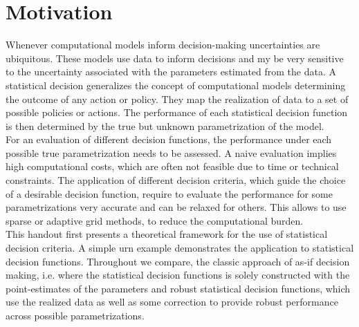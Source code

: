 \section*{Motivation}
Whenever computational models inform decision-making uncertainties are ubiquitous. These models use data to inform decisions and my be very sensitive to the uncertainty associated with the parameters estimated from the data. A statistical decision generalizes the concept of computational models determining the outcome of any action or policy. They map the realization of data to a set of possible policies or actions. The performance of each statistical decision function is then determined by the true but unknown parametrization of the model. \\

For an evaluation of different decision functions, the performance under each possible true parametrization needs to be assessed. A naive evaluation implies high computational costs, which are often not feasible due to time or technical constraints. The application of different decision criteria, which guide the choice of a desirable decision function, require to evaluate the performance for some parametrizations very accurate and can be relaxed for others. This allows to use sparse or adaptive grid methods, to reduce the computational burden. \\

This handout first presents a theoretical framework for the use of statistical decision criteria. A simple urn example demonstrates the application to statistical decision functions. Throughout we compare, the classic approach of as-if decision making, i.e. where the statistical decision functions is solely constructed with the point-estimates of the parameters and robust statistical decision functions, which use the realized data as well as some correction to provide robust performance across possible parametrizations.
